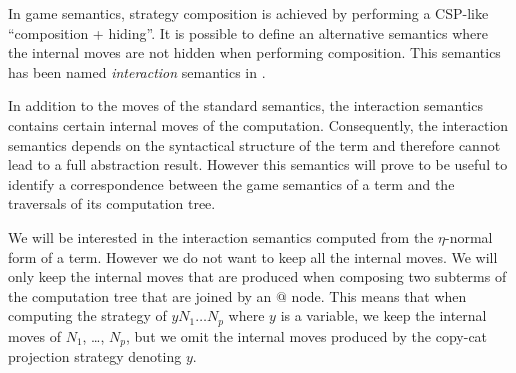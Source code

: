 In game semantics, strategy composition is achieved by performing a CSP-like ``composition + hiding''.
It is possible to define an alternative semantics where the internal moves are not hidden when performing composition.
This semantics has been named \emph{interaction} semantics in \cite{DBLP:conf/sas/DimovskiGL05}.

In addition to the moves of the standard semantics, the interaction semantics contains certain
internal moves of the computation.
Consequently, the interaction semantics depends on the syntactical structure of the term and therefore cannot
lead to a full abstraction result. However this semantics will prove to be useful to identify
a correspondence between the game semantics
of a term and the traversals of its computation tree.

We will be interested in the interaction semantics computed from the
$\eta$-normal form of a term. However we do not want to keep all the internal moves. We will only keep the internal
moves that are produced when composing two subterms of the computation tree that are joined by an $@$ node.
This means that when computing the strategy of
$y N_1 \ldots N_p$ where $y$ is a variable, we keep the internal moves of $N_1$, \ldots, $N_p$, but
we omit the internal moves produced by the copy-cat projection strategy denoting $y$.

